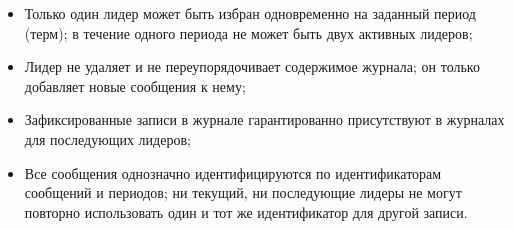 \begin{itemize}
    \item Только один лидер может быть избран одновременно на заданный период (терм);
        в течение одного периода не может быть двух активных лидеров;
    \item Лидер не удаляет и не переупорядочивает содержимое журнала; он только
        добавляет новые сообщения к нему;
    \item Зафиксированные записи в журнале гарантированно присутствуют в журналах
        для последующих лидеров;
    \item Все сообщения однозначно идентифицируются по идентификаторам сообщений
        и периодов; ни текущий, ни последующие лидеры не могут повторно использовать
        один и тот же идентификатор для другой записи.
\end{itemize}

